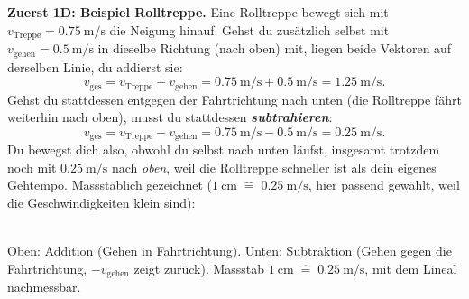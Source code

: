 \documentclass[addpoints,11pt,a4paper]{exam}
\begin{document}
\begin{theoriebox}
\textbf{Zuerst 1D: Beispiel Rolltreppe.} Eine Rolltreppe bewegt sich mit
$v_{\text{Treppe}}=\SI{0.75}{\meter\per\second}$ die Neigung hinauf. Gehst
du zusätzlich selbst mit $v_{\text{gehen}}=\SI{0.5}{\meter\per\second}$ in
dieselbe Richtung (nach oben) mit, liegen beide Vektoren auf derselben
Linie, du addierst sie:
\[
  v_{\text{ges}} = v_{\text{Treppe}} + v_{\text{gehen}} = \SI{0.75}{\meter\per\second} + \SI{0.5}{\meter\per\second} = \SI{1.25}{\meter\per\second}.
\]
Gehst du stattdessen entgegen der Fahrtrichtung nach unten (die Rolltreppe
fährt weiterhin nach oben), musst du stattdessen \textbf{\emph{subtrahieren}}:
\[
  v_{\text{ges}} = v_{\text{Treppe}} - v_{\text{gehen}} = \SI{0.75}{\meter\per\second} - \SI{0.5}{\meter\per\second} = \SI{0.25}{\meter\per\second}.
\]
Du bewegst dich also, obwohl du selbst nach unten läufst, insgesamt
trotzdem noch mit $\SI{0.25}{\meter\per\second}$ nach \emph{oben}, weil die
Rolltreppe schneller ist als dein eigenes Gehtempo. Massstäblich gezeichnet
($\SI{1}{\centi\meter}\;\widehat{=}\;\SI{0.25}{\meter\per\second}$, hier
passend gewählt, weil die Geschwindigkeiten klein sind):

\begin{center}
\\[-0.1em]
{\scriptsize Oben: Addition (Gehen in Fahrtrichtung). Unten: Subtraktion
(Gehen gegen die Fahrtrichtung, $-v_{\text{gehen}}$ zeigt zurück). Massstab
$\SI{1}{\centi\meter}\;\widehat{=}\;\SI{0.25}{\meter\per\second}$, mit dem
Lineal nachmessbar.}
\end{center}


\end{theoriebox}
\end{document}
